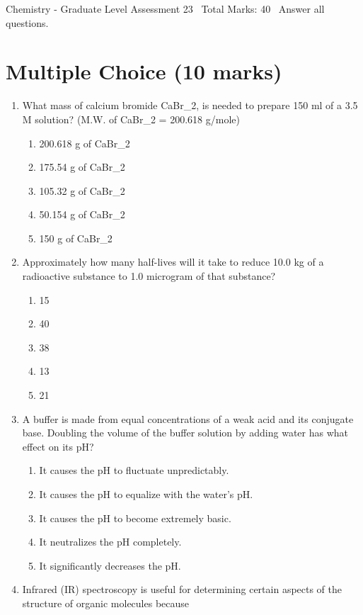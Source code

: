 \documentclass[12pt]{article}
\begin{document}
\begin{center}
Chemistry - Graduate Level Assessment 23 \
Total Marks: 40 \
Answer all questions.
\end{center}

\section*{Multiple Choice (10 marks)}
\begin{enumerate}[label=\arabic*.]
\item What mass of calcium bromide CaBr\_2, is needed to prepare 150 ml of a 3.5 M solution? (M.W. of CaBr\_2 = 200.618 g/mole)
\begin{enumerate}[label=(\alph*)]
    \item 200.618 g of CaBr\_2
    \item 175.54 g of CaBr\_2
    \item 105.32 g of CaBr\_2
    \item 50.154 g of CaBr\_2
    \item 150 g of CaBr\_2
\end{enumerate}
\item Approximately how many half-lives will it take to reduce 10.0 kg of a radioactive substance to 1.0 microgram of that substance?
\begin{enumerate}[label=(\alph*)]
    \item 15
    \item 40
    \item 38
    \item 13
    \item 21
\end{enumerate}
\item A buffer is made from equal concentrations of a weak acid and its conjugate base. Doubling the volume of the buffer solution by adding water has what effect on its pH?
\begin{enumerate}[label=(\alph*)]
    \item It causes the pH to fluctuate unpredictably.
    \item It causes the pH to equalize with the water's pH.
    \item It causes the pH to become extremely basic.
    \item It neutralizes the pH completely.
    \item It significantly decreases the pH.
\end{enumerate}
\item Infrared (IR) spectroscopy is useful for determining certain aspects of the structure of organic molecules because

\end{enumerate}
\end{document}
